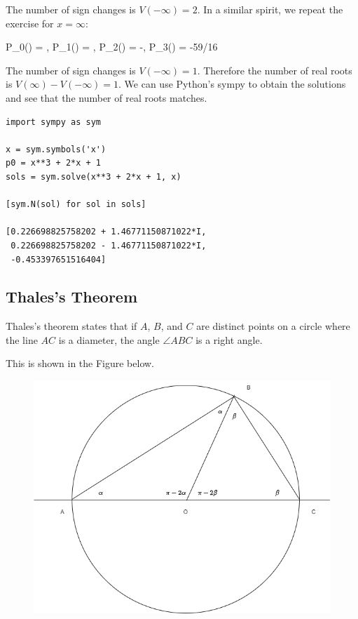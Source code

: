 The number of sign changes is $V(-\infty) = 2$. In a similar spirit, we repeat the exercise for $x = \infty$:

\bee
P_0(\infty) = \infty, P_1(\infty) = \infty, P_2(\infty) = -\infty, P_3(\infty) = -59/16
\eee

The number of sign changes is $V(-\infty) = 1$. Therefore the number of real roots is $V(\infty) - V(-\infty) = 1$. We can use Python's sympy to obtain the solutions and see that the number of real roots matches.

\begin{verbatim}
import sympy as sym

x = sym.symbols('x')
p0 = x**3 + 2*x + 1
sols = sym.solve(x**3 + 2*x + 1, x)

[sym.N(sol) for sol in sols]

[0.226698825758202 + 1.46771150871022*I,
 0.226698825758202 - 1.46771150871022*I,
 -0.453397651516404]
\end{verbatim}


\subsection{Thales's Theorem}

Thales's theorem states that if $A$, $B$, and $C$ are distinct points on a circle where the line $AC$ is a diameter, the angle $\angle ABC$ is a right angle.

This is shown in the Figure below.

\begin{figure}[H]
    \centering
    \includegraphics[scale=0.5]{images/2023-09-26-thales_01.png}
\end{figure}

